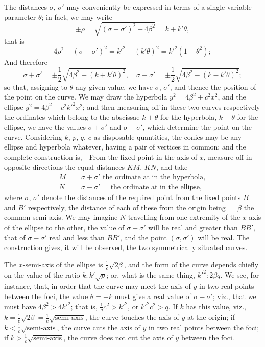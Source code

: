 \documentclass[11pt,a4paper]{article}
\begin{document}
The distances $\sigma$, $\sigma'$ may conveniently be expressed in terms of a single variable parameter $\theta$; in fact, we may write
\[
\pm\rho = \sqrt{(\sigma + \sigma')^2 - 4\beta^2} = k + k'\theta,
\]
that is
\[
4\rho^2 - (\sigma - \sigma')^2 = k'^2 - (k'\theta)^2 = k'^2(1 - \theta^2);
\]
And therefore
\[
\sigma + \sigma' = \pm\frac{1}{2}\sqrt{4\beta^2 + (k + k'\theta)^2},\quad
\sigma - \sigma' = \pm\frac{1}{2}\sqrt{4\beta^2 - (k - k'\theta)^2};
\]
so that, assigning to $\theta$ any given value, we have $\sigma$, $\sigma'$, and thence the position of the point on the curve. We may draw the hyperbola $y^2 = 4\beta^2 + c^2 x^2$, and the ellipse $y^2 = 4\beta^2 - c^2 k'^2 x^2$; and then measuring off in these two curves respectively the ordinates which belong to the abscissae $k + \theta$ for the hyperbola, $k - \theta$ for the ellipse, we have the values $\sigma + \sigma'$ and $\sigma - \sigma'$, which determine the point on the curve. Considering $k$, $p$, $q$, $c$ as disposable quantities, the conics may be any ellipse and hyperbola whatever, having a pair of vertices in common; and the complete construction is,---From the fixed point in the axis of $x$, measure off in opposite directions the equal distances $KM$, $KN$, and take
\begin{align*}
M &= \sigma + \sigma' \text{ the ordinate at in the hyperbola}, \\
N &= \sigma - \sigma' \quad\;\,\text{the ordinate at in the ellipse},
\end{align*}
where $\sigma$, $\sigma'$ denote the distances of the required point from the fixed points $B$ and $B'$ respectively, the distance of each of these from the origin being $= \beta$ the common semi-axis. We may imagine $N$ travelling from one extremity of the $x$-axis of the ellipse to the other, the value of $\sigma + \sigma'$ will be real and greater than $BB'$, that of $\sigma - \sigma'$ real and less than $BB'$, and the point $(\sigma, \sigma')$ will be real. The construction gives, it will be observed, the two symmetrically situated curves.

The $x$-semi-axis of the ellipse is $\frac{1}{c}\sqrt{2\beta}$, and the form of the curve depends chiefly on the value of the ratio $k : k'\sqrt{p}$; or, what is the same thing, $k'^2 : 2\beta q$. We see, for instance, that, in order that the curve may meet the axis of $y$ in two real points between the foci, the value $\theta = -k$ must give a real value of $\sigma - \sigma'$; viz., that we must have $4\beta^2 > 4k'^2$; that is, $\frac{1}{q}c^2 > k'^2$, or $k'^2 c^2 > q$. If $k$ has this value, viz., $k = \frac{1}{c}\sqrt{2\beta} = \frac{1}{c}\sqrt{\text{semi-axis}}$, the curve touches the axis of $y$ at the origin; if $k < \frac{1}{c}\sqrt{\text{semi-axis}}$, the curve cuts the axis of $y$ in two real points between the foci; if $k > \frac{1}{c}\sqrt{\text{semi-axis}}$, the curve does not cut the axis of $y$ between the foci.
\end{document}
